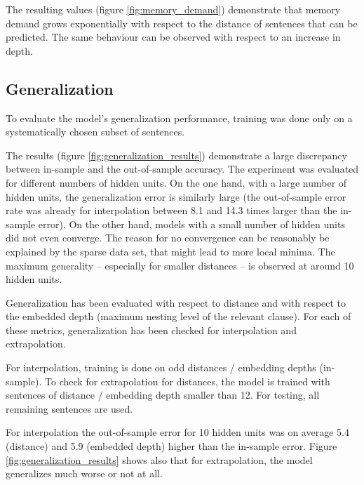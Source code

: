 \documentclass[11pt,a4paper]{article}
\begin{document}
The resulting values (figure \ref{fig:memory_demand}) demonstrate that memory demand grows exponentially with respect to the distance of sentences that can be predicted. The same behaviour can be observed with respect to an increase in depth. 

\subsection{Generalization}
\label{subsec:generalization}

To evaluate the model's generalization performance, training was done only on a systematically chosen subset of sentences.

The results (figure \ref{fig:generalization_results}) demonstrate a large discrepancy between in-sample and the out-of-sample accuracy. The experiment was evaluated for different numbers of hidden units. On the one hand, with a large number of hidden units, the generalization error is similarly large (the out-of-sample error rate was already for interpolation between 8.1 and 14.3 times larger than the in-sample error). %
On the other hand, models with a small number of hidden units did not even converge. The reason for no convergence can be reasonably be explained by the sparse data set, that might lead to more local minima. The maximum generality -- especially for smaller distances -- is observed at around 10 hidden units.

Generalization has been evaluated with respect to distance and with respect to the embedded depth (maximum nesting level of the relevant clause). For each of these metrics, generalization has been checked for interpolation and extrapolation.

For interpolation, training is done on odd distances / embedding depths (in-sample). To check for extrapolation for distances, the model is trained with sentences of distance / embedding depth smaller than 12. For testing, all remaining sentences are used.

For interpolation the out-of-sample error for 10 hidden units was on average 5.4 (distance) and 5.9 (embedded depth) higher than the in-sample error. Figure \ref{fig:generalization_results} shows also that for extrapolation, the model generalizes much worse or not at all.
\end{document}
